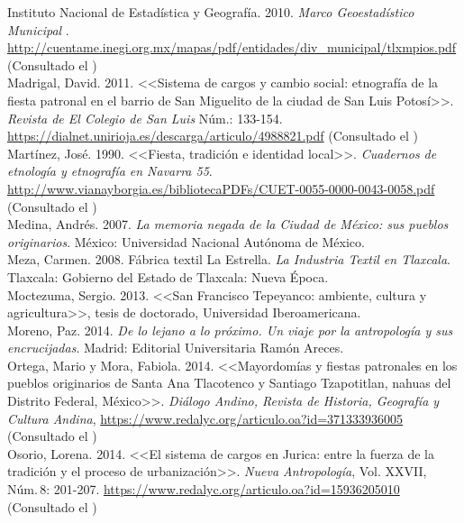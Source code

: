 \documentclass[14pt,letterpaper,twoside]{extbook} %
\begin{document}
\noindent Instituto Nacional de Estadística y Geografía. 2010. \textit{Marco Geoestadístico Municipal }. \url{http://cuentame.inegi.org.mx/mapas/pdf/entidades/div_municipal/tlxmpios.pdf} (Consultado el ) \\

\noindent Madrigal, David. 2011. <<Sistema de cargos y cambio social: etnografía de la fiesta patronal en el barrio de San Miguelito de la ciudad de San Luis Potosí>>. \textit{Revista de El Colegio de San Luis} Núm.: 133-154. \url{https://dialnet.unirioja.es/descarga/articulo/4988821.pdf} (Consultado el ) \\

\noindent Martínez, José. 1990. <<Fiesta, tradición e identidad local>>. \textit{Cuadernos de etnología y etnografía en Navarra 55}. \url{http://www.vianayborgia.es/bibliotecaPDFs/CUET-0055-0000-0043-0058.pdf} (Consultado el ) \\

\noindent Medina, Andrés. 2007. \textit{La memoria negada de la Ciudad de México: sus pueblos originarios}. México: Universidad Nacional Autónoma de México.\\

\noindent Meza, Carmen. 2008. Fábrica textil La Estrella. \textit{La Industria Textil en Tlaxcala}. Tlaxcala: Gobierno del Estado de Tlaxcala: Nueva Época.\\

\noindent Moctezuma, Sergio. 2013. <<San Francisco Tepeyanco: ambiente, cultura y agricultura>>, tesis de doctorado, Universidad Iberoamericana.\\

\noindent Moreno, Paz. 2014. \textit{De lo lejano a lo próximo. Un viaje por la antropología y sus encrucijadas}. Madrid: Editorial Universitaria Ramón Areces.\\

\noindent Ortega, Mario y Mora, Fabiola. 2014. <<Mayordomías y fiestas patronales en los pueblos originarios de Santa Ana Tlacotenco y Santiago Tzapotitlan, nahuas del Distrito Federal, México>>. \textit{Diálogo Andino, Revista de Historia, Geografía y Cultura Andina}, \url{https://www.redalyc.org/articulo.oa?id=371333936005} (Consultado el ) \\

\noindent Osorio, Lorena. 2014. <<El sistema de cargos en Jurica: entre la fuerza de la tradición y el proceso de urbanización>>. \textit{Nueva Antropología}, Vol. \textsc{XXVII}, Núm.\,8: 201-207. \url{https://www.redalyc.org/articulo.oa?id=15936205010} (Consultado el ) \\
\end{document}
